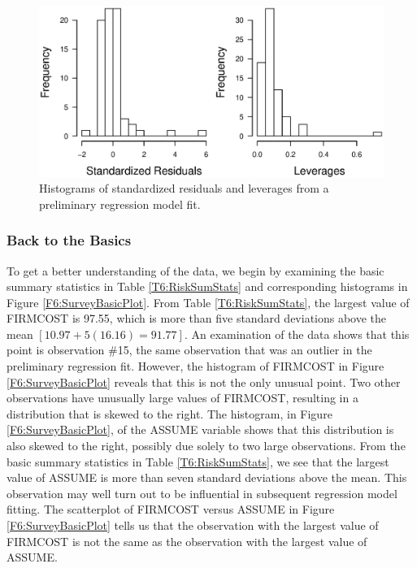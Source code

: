 \begin{figure}[htp]
  \begin{center}
   \includegraphics[width=.6\textwidth]{Chapter6/F6ResidLeverage1.eps}
    \caption{\label{F6:ResidLeverage1}
    \small Histograms of standardized residuals and leverages from a preliminary regression model fit.}
  \end{center}
\end{figure}



\subsubsection*{Back to the Basics}

To get a better understanding of the data, we begin by examining the
basic summary statistics in Table \ref{T6:RiskSumStats} and
corresponding histograms in Figure \ref{F6:SurveyBasicPlot}. From
Table \ref{T6:RiskSumStats}, the largest value of FIRMCOST is 97.55,
which is more than five standard deviations above the mean
$[10.97+5(16.16)=91.77]$. An examination of the data shows that this
point is observation \#15, the same observation that was an outlier
in the preliminary regression fit. However, the histogram of
FIRMCOST in Figure \ref{F6:SurveyBasicPlot} reveals that this is not
the only unusual point. Two other observations have unusually large
values of FIRMCOST, resulting in a distribution that is skewed to
the right. The histogram, in Figure \ref{F6:SurveyBasicPlot}, of the
ASSUME variable shows that this distribution is also skewed to the
right, possibly due solely to two large observations. From the basic
summary statistics in Table \ref{T6:RiskSumStats}, we see that the
largest value of ASSUME is more than seven standard deviations above
the mean. This observation may well turn out to be influential in
subsequent regression model fitting. The scatterplot of FIRMCOST
versus ASSUME in Figure \ref{F6:SurveyBasicPlot} tells us that the
observation with the largest value of FIRMCOST is not the same as
the observation with the largest value of ASSUME.



